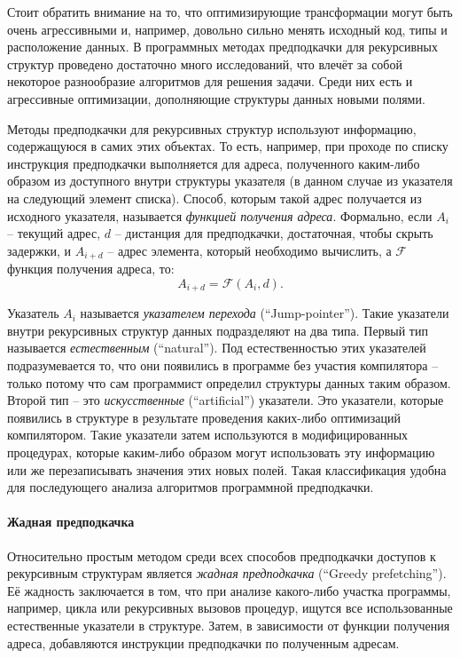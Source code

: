 \documentclass[12pt,a4paper]{article}
\begin{document}
Стоит обратить внимание на то, что оптимизирующие трансформации могут быть очень агрессивными и, например, довольно сильно менять исходный код, типы и расположение данных. В программных методах предподкачки для рекурсивных структур проведено достаточно много исследований, что влечёт за собой некоторое разнообразие алгоритмов для решения задачи. Среди них есть и агрессивные оптимизации, дополняющие структуры данных новыми полями.

Методы предподкачки для рекурсивных структур используют информацию, содержащуюся в самих этих объектах. То есть, например, при проходе по списку инструкция предподкачки выполняется для адреса, полученного каким-либо образом из доступного внутри структуры указателя (в данном случае из указателя на следующий элемент списка). Способ, которым такой адрес получается из исходного указателя, называется \emph{функцией получения адреса}. Формально, если $A_i$ -- текущий адрес, $d$ -- дистанция для предподкачки, достаточная, чтобы скрыть задержки, и $A_{i+d}$ -- адрес элемента, который необходимо вычислить, а $\mathcal{F}$ функция получения адреса, то:
\begin{displaymath}
  A_{i+d} = \mathcal{F}(A_i,d).
\end{displaymath}

Указатель $A_i$ называется \emph{указателем перехода} (``Jump-pointer''). Такие указатели внутри рекурсивных структур данных подразделяют на два типа. Первый тип называется \emph{естественным} (``natural''). Под естественностью этих указателей подразумевается то, что они появились в программе без участия компилятора -- только потому что сам программист определил структуры данных таким образом. Второй тип -- это \emph{искусственные} (``artificial'') указатели. Это указатели, которые появились в структуре в результате проведения каких-либо оптимизаций компилятором. Такие указатели затем используются в модифицированных процедурах, которые каким-либо образом могут использовать эту информацию или же перезаписывать значения этих новых полей. Такая классификация удобна для последующего анализа алгоритмов программной предподкачки.

\paragraph{Жадная предподкачка}

Относительно простым методом среди всех способов предподкачки доступов к рекурсивным структурам является \emph{жадная предподкачка} (``Greedy prefetching''). Её жадность заключается в том, что при анализе какого-либо участка программы, например, цикла или рекурсивных вызовов процедур, ищутся все использованные естественные указатели в структуре. Затем, в зависимости от функции получения адреса, добавляются инструкции предподкачки по полученным адресам.
\end{document}
